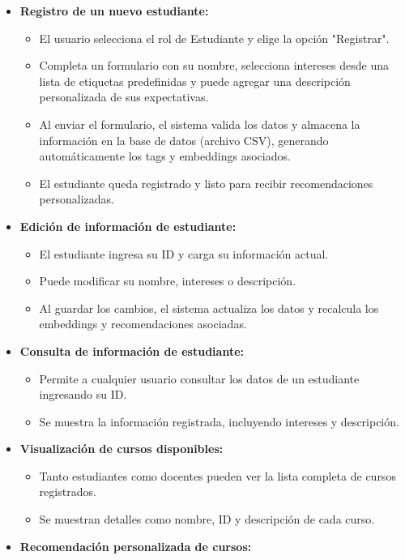 \documentclass[12pt]{article}
\begin{document}
\begin{itemize}
    \item \textbf{Registro de un nuevo estudiante:}
    \begin{itemize}
        \item El usuario selecciona el rol de Estudiante y elige la opción "Registrar".
        \item Completa un formulario con su nombre, selecciona intereses desde una lista de etiquetas predefinidas y puede agregar una descripción personalizada de sus expectativas.
        \item Al enviar el formulario, el sistema valida los datos y almacena la información en la base de datos (archivo CSV), generando automáticamente los tags y embeddings asociados.
        \item El estudiante queda registrado y listo para recibir recomendaciones personalizadas.
    \end{itemize}
    \item \textbf{Edición de información de estudiante:}
    \begin{itemize}
        \item El estudiante ingresa su ID y carga su información actual.
        \item Puede modificar su nombre, intereses o descripción.
        \item Al guardar los cambios, el sistema actualiza los datos y recalcula los embeddings y recomendaciones asociadas.
    \end{itemize}
    \item \textbf{Consulta de información de estudiante:}
    \begin{itemize}
        \item Permite a cualquier usuario consultar los datos de un estudiante ingresando su ID.
        \item Se muestra la información registrada, incluyendo intereses y descripción.
    \end{itemize}
    \item \textbf{Visualización de cursos disponibles:}
    \begin{itemize}
        \item Tanto estudiantes como docentes pueden ver la lista completa de cursos registrados.
        \item Se muestran detalles como nombre, ID y descripción de cada curso.
    \end{itemize}
    \item \textbf{Recomendación personalizada de cursos:}

\end{itemize}
\end{document}
